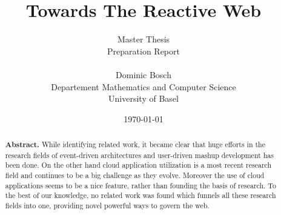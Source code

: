 \documentclass[11pt]{article}%
\newcommand{\subtitle}[1]{%
  \posttitle{%
    \par\end{center}
    \begin{center}\large#1\end{center}
    \vskip0.5em}%
}
\begin{document}
\title{\huge Towards The Reactive Web\vspace*{15 mm}}
\date{\today}
\author{\fontsize{11}{9}\selectfont
Master Thesis\\
Preparation Report\\
\vspace*{10 mm}\\
Dominic Bosch\\
Departement Mathematics and Computer Science\\
University of Basel
}
\maketitle

\renewcommand{\abstractname}{}
\begin{abstract}
\textbf{Abstract.}
While identifying related work, it became clear that huge efforts in the research fields of event-driven architectures and user-driven mashup development has been done. On the other hand cloud application utilization is a most recent research field and continues to be a big challenge as they evolve. Moreover the use of cloud applications seems to be a nice feature, rather than founding the basis of research. To the best of our knowledge, no related work was found which funnels all these research fields into one, providing novel powerful ways to govern the web.
\end{abstract}
\end{document}
